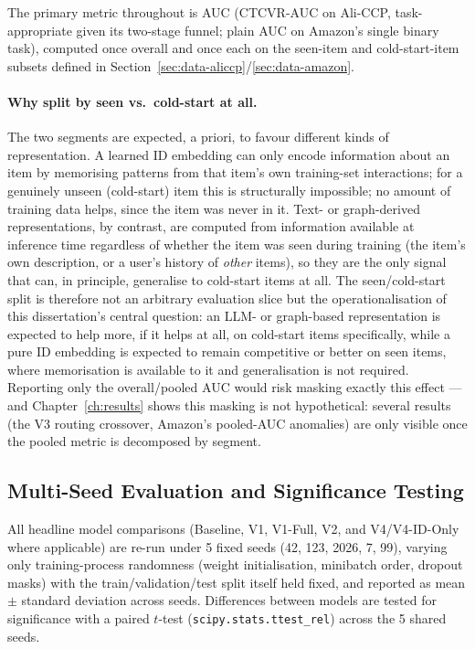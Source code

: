 The primary metric throughout is AUC (CTCVR-AUC on Ali-CCP, task-appropriate given its two-stage funnel; plain AUC on Amazon's single binary task), computed once overall and once each on the seen-item and cold-start-item subsets defined in Section~\ref{sec:data-aliccp}/\ref{sec:data-amazon}.

\paragraph{Why split by seen vs.\ cold-start at all.} The two segments are expected, a priori, to favour different kinds of representation. A learned ID embedding can only encode information about an item by memorising patterns from that item's own training-set interactions; for a genuinely unseen (cold-start) item this is structurally impossible; no amount of training data helps, since the item was never in it. Text- or graph-derived representations, by contrast, are computed from information available at inference time regardless of whether the item was seen during training (the item's own description, or a user's history of \emph{other} items), so they are the only signal that can, in principle, generalise to cold-start items at all. The seen/cold-start split is therefore not an arbitrary evaluation slice but the operationalisation of this dissertation's central question: an LLM- or graph-based representation is expected to help more, if it helps at all, on cold-start items specifically, while a pure ID embedding is expected to remain competitive or better on seen items, where memorisation is available to it and generalisation is not required. Reporting only the overall/pooled AUC would risk masking exactly this effect --- and Chapter~\ref{ch:results} shows this masking is not hypothetical: several results (the V3 routing crossover, Amazon's pooled-AUC anomalies) are only visible once the pooled metric is decomposed by segment.

\subsection{Multi-Seed Evaluation and Significance Testing}
\label{sec:metrics-multiseed}

All headline model comparisons (Baseline, V1, V1-Full, V2, and V4/V4-ID-Only where applicable) are re-run under 5 fixed seeds (42, 123, 2026, 7, 99), varying only training-process randomness (weight initialisation, minibatch order, dropout masks) with the train/validation/test split itself held fixed, and reported as mean $\pm$ standard deviation across seeds. Differences between models are tested for significance with a paired $t$-test (\texttt{scipy.stats.ttest\_rel}) across the 5 shared seeds.

